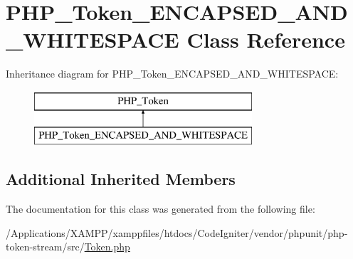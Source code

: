 \hypertarget{class_p_h_p___token___e_n_c_a_p_s_e_d___a_n_d___w_h_i_t_e_s_p_a_c_e}{}\section{P\+H\+P\+\_\+\+Token\+\_\+\+E\+N\+C\+A\+P\+S\+E\+D\+\_\+\+A\+N\+D\+\_\+\+W\+H\+I\+T\+E\+S\+P\+A\+CE Class Reference}
\label{class_p_h_p___token___e_n_c_a_p_s_e_d___a_n_d___w_h_i_t_e_s_p_a_c_e}
Inheritance diagram for P\+H\+P\+\_\+\+Token\+\_\+\+E\+N\+C\+A\+P\+S\+E\+D\+\_\+\+A\+N\+D\+\_\+\+W\+H\+I\+T\+E\+S\+P\+A\+CE\+:\begin{figure}[H]
\begin{center}
\leavevmode
\includegraphics[height=2.000000cm]{class_p_h_p___token___e_n_c_a_p_s_e_d___a_n_d___w_h_i_t_e_s_p_a_c_e}
\end{center}
\end{figure}
\subsection*{Additional Inherited Members}


The documentation for this class was generated from the following file\+:\begin{DoxyCompactItemize}
\item 
/\+Applications/\+X\+A\+M\+P\+P/xamppfiles/htdocs/\+Code\+Igniter/vendor/phpunit/php-\/token-\/stream/src/\mbox{\hyperlink{_token_8php}{Token.\+php}}\end{DoxyCompactItemize}
